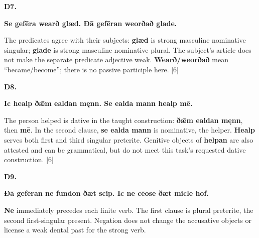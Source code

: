 \par\begin{minipage}{\linewidth}\raggedright
\textbf{D7.}

\textbf{Se gefēra wearð glæd. Ðā gefēran weorðað glade.}

The predicates agree with their subjects: \textbf{glæd} is strong masculine nominative singular; \textbf{glade} is strong masculine nominative plural. The subject's article does not make the separate predicate adjective weak. \textbf{Wearð/\allowbreak{}weorðað} mean “became/\allowbreak{}become”; there is no passive participle here. [6]

\end{minipage}\par\addvspace{4pt}

\par\begin{minipage}{\linewidth}\raggedright
\textbf{D8.}

\textbf{Ic healp ðǣm ealdan męnn. Se ealda mann healp mē.}

The person helped is dative in the taught construction: \textbf{ðǣm ealdan męnn}, then \textbf{mē}. In the second clause, \textbf{se ealda mann} is nominative, the helper. \textbf{Healp} serves both first and third singular preterite. Genitive objects of \textbf{helpan} are also attested and can be grammatical, but do not meet this task's requested dative construction. [6]

\end{minipage}\par\addvspace{4pt}

\par\begin{minipage}{\linewidth}\raggedright
\textbf{D9.}

\textbf{Ðā gefēran ne fundon ðæt scip. Ic ne cēose ðæt micle hof.}

\textbf{Ne} immediately precedes each finite verb. The first clause is plural preterite, the second first-singular present. Negation does not change the accusative objects or license a weak dental past for the strong verb.

\end{minipage}\par\addvspace{4pt}

